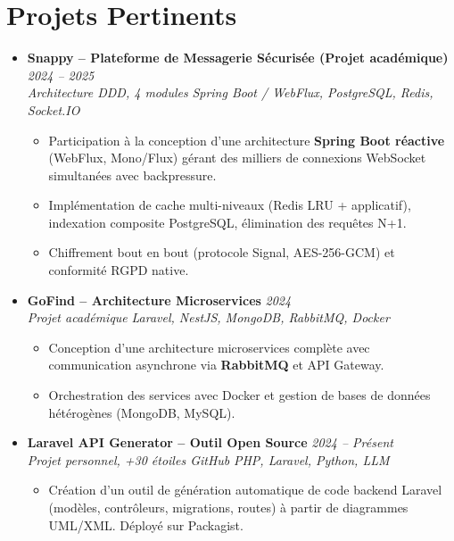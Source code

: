 \documentclass[a4paper,11pt]{article}
\begin{document}
\section{Projets Pertinents}
\begin{itemize}[leftmargin=*, label={-}]

\item \textbf{Snappy -- Plateforme de Messagerie Sécurisée (Projet académique)} \hfill \textit{2024 -- 2025} \\
\textit{Architecture DDD, 4 modules} \hfill \textit{Spring Boot / WebFlux, PostgreSQL, Redis, Socket.IO}
\vspace{-2pt}
    \begin{itemize}[leftmargin=0.4cm, nosep, label=\tiny$\bullet$]
        \item \small{Participation à la conception d'une architecture \textbf{Spring Boot réactive} (WebFlux, Mono/Flux) gérant des milliers de connexions WebSocket simultanées avec backpressure.}
        \item \small{Implémentation de cache multi-niveaux (Redis LRU + applicatif), indexation composite PostgreSQL, élimination des requêtes N+1.}
        \item \small{Chiffrement bout en bout (protocole Signal, AES-256-GCM) et conformité RGPD native.}
    \end{itemize}
\vspace{3pt}

\item \textbf{GoFind -- Architecture Microservices} \hfill \textit{2024} \\
\textit{Projet académique} \hfill \textit{Laravel, NestJS, MongoDB, RabbitMQ, Docker}
\vspace{-2pt}
    \begin{itemize}[leftmargin=0.4cm, nosep, label=\tiny$\bullet$]
        \item \small{Conception d'une architecture microservices complète avec communication asynchrone via \textbf{RabbitMQ} et API Gateway.}
        \item \small{Orchestration des services avec Docker et gestion de bases de données hétérogènes (MongoDB, MySQL).}
    \end{itemize}
\vspace{3pt}

\item \textbf{Laravel API Generator -- Outil Open Source} \hfill \textit{2024 -- Présent} \\
\textit{Projet personnel, +30 étoiles GitHub} \hfill \textit{PHP, Laravel, Python, LLM}
\vspace{-2pt}
    \begin{itemize}[leftmargin=0.4cm, nosep, label=\tiny$\bullet$]
        \item \small{Création d'un outil de génération automatique de code backend Laravel (modèles, contrôleurs, migrations, routes) à partir de diagrammes UML/XML. Déployé sur Packagist.}
    \end{itemize}
\vspace{3pt}

\end{itemize}
\end{document}

